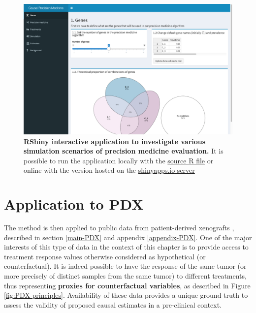 \documentclass[a4paper,12pt,twoside,onecolumn,openright,final,oldfontcommands]{memoir}
\begin{document}
\begin{figure}

{\centering \includegraphics[width=0.9\linewidth]{fig/screenshot-shiny} 

}

\caption[RShiny interactive application to investigate various simulation scenarios of precision medicine evaluation]{\textbf{RShiny interactive application to
investigate various simulation scenarios of precision medicine
evaluation.} It is possible to run the application locally with the
\href{https://github.com/JonasBeal/Causal_Precision_Medicine/blob/master/Application_Causal_PM.R}{source
R file} or online with the version hosted on the
\href{https://jonasbeal.shinyapps.io/application_causal_pm/}{shinyapps.io
server}}\label{fig:Shiny}
\end{figure}









\section{Application to PDX}\label{application-to-pdx}

The method is then applied to public data from patient-derived
xenografts \citep{gao2015high}, described in section \ref{main-PDX} and
appendix \ref{appendix-PDX}. One of the major interests of this type of
data in the context of this chapter is to provide access to treatment
response values otherwise considered as hypothetical (or
counterfactual). It is indeed possible to have the response of the same
tumor (or more precisely of distinct samples from the same tumor) to
different treatments, thus representing \textbf{proxies for
counterfactual variables}, as described in Figure
\ref{fig:PDX-principles}. Availability of these data provides a unique
ground truth to assess the validity of proposed causal estimates in a
pre-clinical context.
\end{document}
